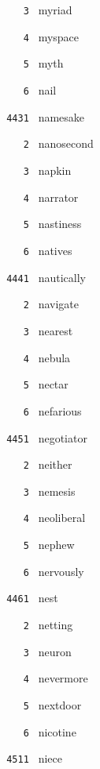 \documentclass[11pt]{article}
\begin{document}
\begin{multicols}{6}
\noindent \texttt{ \ \ \ 3 } myriad  \par
\noindent \texttt{ \ \ \ 4 } myspace  \par
\noindent \texttt{ \ \ \ 5 } myth  \par
\noindent \texttt{ \ \ \ 6 } nail  \par
\vspace{3mm}
\noindent \texttt{ 4431 } namesake  \par
\noindent \texttt{ \ \ \ 2 } nanosecond  \par
\noindent \texttt{ \ \ \ 3 } napkin  \par
\noindent \texttt{ \ \ \ 4 } narrator  \par
\noindent \texttt{ \ \ \ 5 } nastiness  \par
\noindent \texttt{ \ \ \ 6 } natives  \par
\vspace{3mm}
\noindent \texttt{ 4441 } nautically  \par
\noindent \texttt{ \ \ \ 2 } navigate  \par
\noindent \texttt{ \ \ \ 3 } nearest  \par
\noindent \texttt{ \ \ \ 4 } nebula  \par
\noindent \texttt{ \ \ \ 5 } nectar  \par
\noindent \texttt{ \ \ \ 6 } nefarious  \par
\vspace{3mm}
\noindent \texttt{ 4451 } negotiator  \par
\noindent \texttt{ \ \ \ 2 } neither  \par
\noindent \texttt{ \ \ \ 3 } nemesis  \par
\noindent \texttt{ \ \ \ 4 } neoliberal  \par
\noindent \texttt{ \ \ \ 5 } nephew  \par
\noindent \texttt{ \ \ \ 6 } nervously  \par
\vspace{3mm}
\noindent \texttt{ 4461 } nest  \par
\noindent \texttt{ \ \ \ 2 } netting  \par
\noindent \texttt{ \ \ \ 3 } neuron  \par
\noindent \texttt{ \ \ \ 4 } nevermore  \par
\noindent \texttt{ \ \ \ 5 } nextdoor  \par
\noindent \texttt{ \ \ \ 6 } nicotine  \par
\noindent \texttt{ 4511 } niece  \par

\end{multicols}
\end{document}
